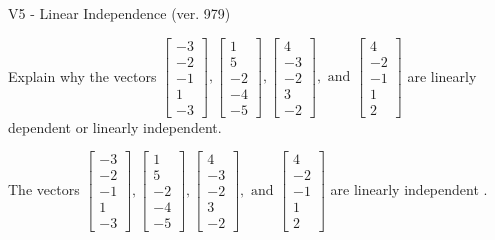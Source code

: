 \begin{exercise}
  \begin{exerciseTitle}V5 - Linear Independence (ver. 979)\end{exerciseTitle}
  \begin{exerciseStatement}
    Explain why the vectors \(\left[\begin{array}{r}
-3 \\
-2 \\
-1 \\
1 \\
-3
\end{array}\right] , \left[\begin{array}{r}
1 \\
5 \\
-2 \\
-4 \\
-5
\end{array}\right] , \left[\begin{array}{r}
4 \\
-3 \\
-2 \\
3 \\
-2
\end{array}\right] , \text{ and } \left[\begin{array}{r}
4 \\
-2 \\
-1 \\
1 \\
2
\end{array}\right]\) are linearly dependent or linearly independent.	


  \end{exerciseStatement}
  \begin{exerciseAnswer}
   The vectors \(\left[\begin{array}{r}
-3 \\
-2 \\
-1 \\
1 \\
-3
\end{array}\right] , \left[\begin{array}{r}
1 \\
5 \\
-2 \\
-4 \\
-5
\end{array}\right] , \left[\begin{array}{r}
4 \\
-3 \\
-2 \\
3 \\
-2
\end{array}\right] , \text{ and } \left[\begin{array}{r}
4 \\
-2 \\
-1 \\
1 \\
2
\end{array}\right]\) are 
  	 linearly independent  .
  


  \end{exerciseAnswer}
\end{exercise}